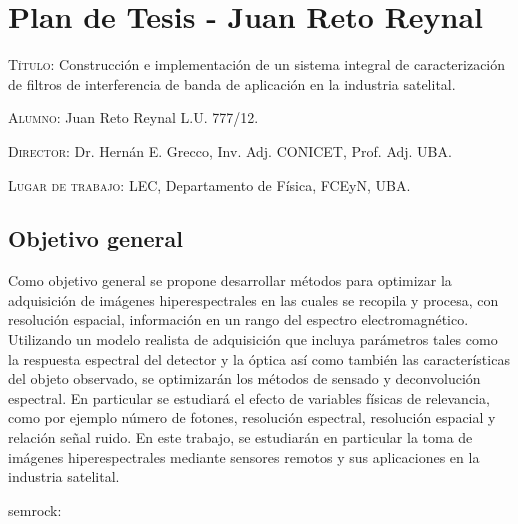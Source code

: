 \documentclass{ctuthesis}
\begin{document}
\maketitle
\renewcommand{\chaptername}{Capítulo}
\chapter*{Plan de Tesis - Juan Reto Reynal}


\textsc{Título:} Construcción e implementación de un sistema integral de caracterización de filtros de interferencia de banda de aplicación en la industria satelital.


\hspace{-0.4cm}\textsc{Alumno:} Juan Reto Reynal L.U. 777/12.

\hspace{-0.4cm}\textsc{Director:} Dr. Hernán E. Grecco, Inv. Adj. CONICET, Prof. Adj. UBA.

\hspace{-0.4cm}\textsc{Lugar de trabajo:} LEC, Departamento de Física, FCEyN, UBA.


\section*{Objetivo general}
Como objetivo general se propone desarrollar métodos para optimizar la
adquisición de imágenes hiperespectrales en las cuales se recopila y procesa, con
resolución espacial, información en un rango del espectro electromagnético. Utilizando
un modelo realista de adquisición que incluya parámetros tales como la respuesta
espectral del detector y la óptica así como también las características del objeto
observado, se optimizarán los métodos de sensado y deconvolución espectral. En
particular se estudiará el efecto de variables físicas de relevancia, como por ejemplo
número de fotones, resolución espectral, resolución espacial y relación señal ruido. En
este trabajo, se estudiarán en particular la toma de imágenes hiperespectrales
mediante sensores remotos y sus aplicaciones en la industria satelital.


semrock:
\end{document}
